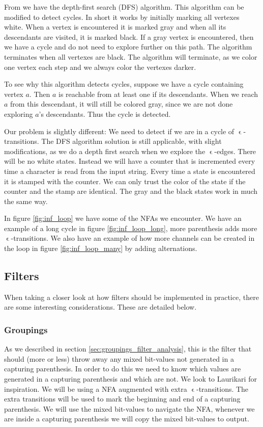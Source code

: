 From \cite{Cormen} we have the depth-first search (DFS)
algorithm. This algorithm can be modified to detect cycles. In short
it works by initially marking all vertexes white. When a vertex is
encountered it is marked gray and when all its descendants are
visited, it is marked black. If a gray vertex is encountered, then we
have a cycle and do not need to explore further on this path. The
algorithm terminates when all vertexes are black. The algorithm will
terminate, as we color one vertex each step and we always color the
vertexes darker.

To see why this algorithm detects cycles, suppose we have a cycle
containing vertex $a$. Then $a$ is reachable from at least one if its
descendants. When we reach $a$ from this descendant, it will still be
colored gray, since we are not done exploring $a$'s descendants. Thus
the cycle is detected.

Our problem is slightly different: We need to detect if we are in a
cycle of $\upvarepsilon$-transitions. The DFS algorithm solution is
still applicable, with slight modifications, as we do a depth first
search when we explore the $\upvarepsilon$-edges. There will be no
white states. Instead we will have a counter that is incremented every
time a character is read from the input string. Every time a state is
encountered it is stamped with the counter. We can only trust the
color of the state if the counter and the stamp are identical. The
gray and the black states work in much the same way.

In figure \vref{fig:inf_loop} we have some of the NFAs we
encounter. We have an example of a long cycle in figure
\ref{fig:inf_loop_long}, more parenthesis adds more
$\upvarepsilon$-transitions. We also have an example of how more
channels can be created in the loop in figure \ref{fig:inf_loop_many}
by adding alternations. 


\subsection{Filters}
When taking a closer look at how filters should be implemented in practice, there are some interesting considerations. These are detailed below.

\subsubsection{Groupings}
As we described in section \vref{sec:groupings_filter_analysis}, this
is the filter that should (more or less) throw away any mixed
bit-values not generated in a capturing parenthesis. In order to do
this we need to know which values are generated in a capturing
parenthesis and which are not. We look to Laurikari
\cite{laurikari2001} for inspiration. We will be using a NFA augmented
with extra $\upvarepsilon$-transitions. The extra transitions will be
used to mark the beginning and end of a capturing parenthesis. We will
use the mixed bit-values to navigate the NFA, whenever we are inside a
capturing parenthesis we will copy the mixed bit-values to output. 

